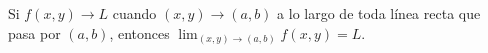 \item Si $f(x, y) \to L$ cuando $(x, y) \to (a, b)$ a lo largo de toda línea recta que pasa por $(a, b)$, entonces $\lim_{(x, y) \to (a, b)} f(x, y) = L$.
